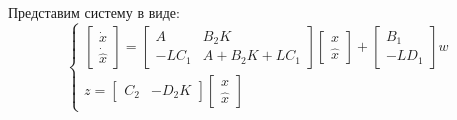 Представим систему в виде:
\begin{equation}
    \begin{cases}
        \begin{bmatrix}
            \dot{x} \\
            \dot{\hat{x}}
        \end{bmatrix} =
        \begin{bmatrix}
            A & B_2K \\
            -LC_1 & A + B_2K + LC_1
        \end{bmatrix}
        \begin{bmatrix}
            x \\
            \hat{x}
        \end{bmatrix} +
        \begin{bmatrix}
            B_1 \\ -LD_1 
        \end{bmatrix}w \\

        z = \begin{bmatrix}
            C_2 & -D_2K
        \end{bmatrix}
        \begin{bmatrix}
            x \\
            \hat{x}
        \end{bmatrix}
    \end{cases}
\end{equation}


